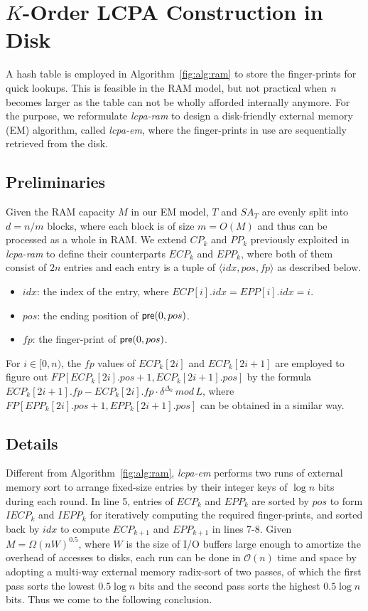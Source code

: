 \documentclass{llncs}
\begin{document}
\section{$K$-Order LCPA Construction in Disk}\label{sec:construction_in_em}

A hash table is employed in Algorithm~\ref{fig:alg:ram} to store the finger-prints for quick lookups. This is feasible in the RAM model, but not practical when {\em n} becomes larger as the table can not be wholly afforded internally anymore. For the purpose, we reformulate {\em lcpa-ram} to design a disk-friendly external memory (EM) algorithm, called {\em lcpa-em}, where the finger-prints in use are sequentially retrieved from the disk.

\subsection{Preliminaries}

Given the {RAM} capacity $M$ in our {EM} model, $T$ and $SA_T$ are evenly split into $d=n/m$ blocks, where each block is of size $m=O(M)$ and thus can be processed as a whole in {RAM}. We extend $CP_k$ and $PP_k$ previously exploited in {\em lcpa-ram} to define their counterparts $ECP_k$ and $EPP_k$, where both of them consist of $2n$ entries and each entry is a tuple of $\langle idx, pos, fp \rangle$ as described below.
\begin{itemize}
\item $idx$: the index of the entry, where $ECP[i].idx=EPP[i].idx=i$.
\item $pos$: the ending position of ${\sf pre}(0,pos)$.
\item $fp$: the finger-print of ${\sf pre}(0,pos)$.
\end{itemize}

For $i\in [0,n)$, the $fp$ values of $ECP_k[2i]$ and $ECP_k[2i+1]$ are employed to figure out $FP[ECP_k[2i].pos+1, ECP_k[2i+1].pos]$ by the formula $ECP_k[2i+1].fp - ECP_k[2i].fp \cdot \delta^{\Delta_k} \, mod \, L$, where $FP[EPP_k[2i].pos+1, EPP_k[2i+1].pos]$ can be obtained in a similar way.

\subsection{Details}
Different from Algorithm~\ref{fig:alg:ram}, {\em lcpa-em} performs two runs of external memory sort to arrange fixed-size entries by their integer keys of $\log n$ bits during each round. In line 5, entries of $ECP_k$ and $EPP_k$ are sorted by $pos$ to form $IECP_k$ and $IEPP_k$ for iteratively computing the required finger-prints, and sorted back by $idx$ to compute $ECP_{k+1}$ and $EPP_{k+1}$ in lines 7-8. Given $M=\Omega(nW)^{0.5}$, where $W$ is the size of {I/O} buffers large enough to amortize the overhead of accesses to disks, each run can be done in $\mathcal{O}(n)$ time and space by adopting a multi-way external memory radix-sort of two passes, of which the first pass sorts the lowest $0.5\log n$ bits and the second pass sorts the highest $0.5\log n$ bits. Thus we come to the following conclusion.
\end{document}
